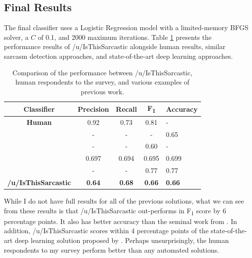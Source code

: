 \documentclass[a4paper,12pt]{article}
\begin{document}
\subsection{Final Results}
The final classifier uses a Logistic Regression model with a limited-memory BFGS solver, a $C$ of 0.1, and 2000 maximum iterations. Table \ref{tab:cmd3} presents the performance results of /u/IsThisSarcastic alongside human results, similar sarcasm detection approaches, and state-of-the-art deep learning approaches.

\begin{table}[h!]
\begin{tabular}{|c|c|c|c|l|}
\hline
\textbf{Classifier}                    & \textbf{Precision} & \textbf{Recall} & \textbf{F\textsubscript{1}} & \textbf{Accuracy} \\ \hline
\textbf{Human}                         & 0.92               & 0.73            & 0.81                        & -                 \\ \hline
\textbf{\cite{gonzalez-ibanezIdentifyingSarcasmTwitter2011}} & -                  & -               & -                           & 0.65              \\ \hline
\textbf{\cite{clicheSarcasmDetector2014}}                 & -                  & -               & 0.60                        & -                 \\ \hline
\textbf{\cite{tayReasoningSarcasmReading2018}}             & 0.697              & 0.694           & 0.695                       & 0.699             \\ \hline
\textbf{\cite{hazarikaCASCADEContextualSarcasm2018}}        & -                  & -               & 0.77                        & 0.77              \\ \hline
\textbf{/u/IsThisSarcastic}            & \textbf{0.64}               & \textbf{0.68}            & \textbf{0.66}                        & \textbf{0.66}              \\ \hline
\end{tabular}
\caption{Comparison of the performance between /u/IsThisSarcastic, human respondents to the survey, and various examples of previous work.}
\label{tab:cmd3}
\end{table}

While I do not have full results for all of the previous solutions, what we can see from these results is that /u/IsThisSarcastic out-performs \cite{clicheSarcasmDetector2014} in F\textsubscript{1} score by 6 percentage points. It also has better accuracy than the seminal work from \cite{gonzalez-ibanezIdentifyingSarcasmTwitter2011}. In addition, /u/IsThisSarcastic scores within 4 percentage points of the state-of-the-art deep learning solution proposed by \cite{tayReasoningSarcasmReading2018}. Perhaps unsurprisingly, the human respondents to my survey perform better than any automated solutions.
\end{document}
